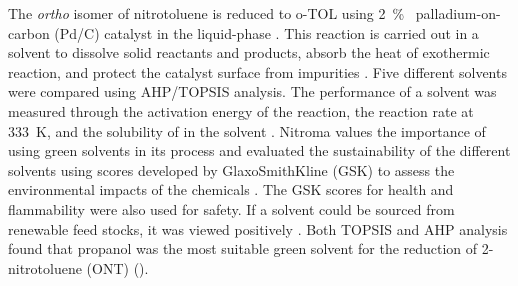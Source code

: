 The \textit{ortho} isomer of nitrotoluene is reduced to o-TOL using \SI{2}{\percent\ww} palladium-on-carbon (Pd/C) catalyst in the liquid-phase \cite{rajadhyaksha_solvent_1986}. This reaction is carried out in a solvent to dissolve solid reactants and products, absorb the heat of exothermic reaction, and protect the catalyst surface from impurities \cite{yao_kinetics_1959}. Five different solvents were compared using AHP/TOPSIS analysis. The performance of a solvent was measured through the activation energy of the reaction, the reaction rate at \SI{333}{\K}, and the solubility of  in the solvent \cite{rajadhyaksha_solvent_1986}. Nitroma values the importance of using green solvents in its process and evaluated the sustainability of the different solvents using scores developed by GlaxoSmithKline (GSK) to assess the environmental impacts of the chemicals \cite{henderson_expanding_2011}. The GSK scores for health and flammability were also used for safety. If a solvent could be sourced from renewable feed stocks, it was viewed positively \cite{byrne_tools_2016}. Both TOPSIS and AHP analysis found that propanol was the most suitable green solvent for the reduction of 2-nitrotoluene (ONT) ().


